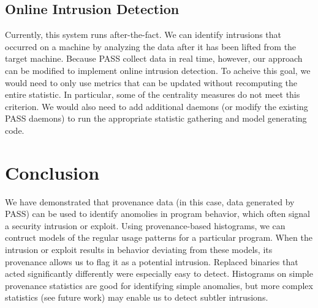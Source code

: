 \documentclass[10pt,twocolumn]{article}
\begin{document}
\subsection{Online Intrusion Detection}
Currently, this system runs after-the-fact. We can identify intrusions that occurred on a machine by analyzing the data after it has been lifted from the target machine. Because PASS collect data in real time, however, our approach can be modified to implement online intrusion detection. To acheive this goal, we would need to only use metrics that can be updated without recomputing the entire statistic. In particular, some of the centrality measures do not meet this criterion. We would also need to add additional daemons (or modify the existing PASS daemons) to run the appropriate statistic gathering and model generating code. 
\section{Conclusion}
We have demonstrated that provenance data (in this case, data generated by PASS) can be used to identify anomolies in program behavior, which often signal a security intrusion or exploit. Using provenance-based histograms, we can contruct models of the regular usage patterns for a particular program. When the intrusion or exploit results in behavior deviating from these models, its provenance allows us to flag it as a potential intrusion. Replaced binaries that acted significantly differently were especially easy to detect. Histograms on simple provenance statistics are good for identifying simple anomalies, but more complex statistics (see future work) may enable us to detect subtler intrusions.

%
\end{document}
